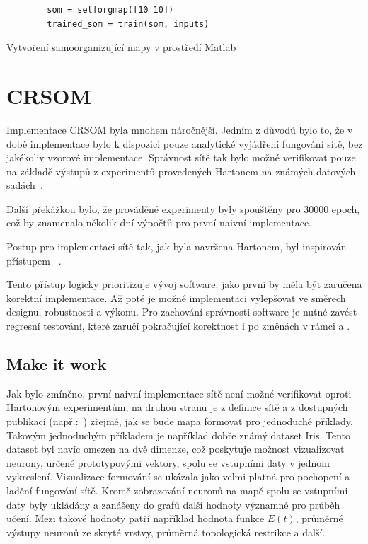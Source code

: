 \documentclass[thesis=M,czech]{FITthesis}[2012/06/26]
\begin{document}
\begin{listing}
    \begin{verbatim}
        som = selforgmap([10 10])
        trained_som = train(som, inputs)
    \end{verbatim} 
    \caption{Vytvoření samoorganizující mapy v prostředí Matlab} 
    \label{somcode}
\end{listing}

\section{CRSOM}\label{sec:crsom_impl}


Implementace CRSOM byla mnohem náročnější. Jedním z důvodů bylo to, že v době implementace bylo k dispozici pouze analytické vyjádření fungování sítě, bez jakékoliv vzorové implementace.
Správnost sítě tak bylo možné verifikovat pouze na základě výstupů z experimentů provedených Hartonem na známých datových sadách~\cite{hartonomain}.

Další překážkou bylo, že prováděné experimenty byly spouštěny pro $30 000$ epoch, což by znamenalo několik dní výpočtů pro první naivní implementace.
	
Postup pro implementaci sítě tak, jak byla navržena Hartonem, byl inspirován přístupem \textit{}~\cite{makeit}. 

Tento přístup logicky prioritizuje vývoj software: jako první by měla být zaručena korektní implementace. Až poté je možné implementaci vylepšovat ve směrech designu, robustnosti a výkonu. Pro zachování správnosti software je nutné zavést regresní testování, které zaručí pokračující korektnost i po změnách v rámci  a .

\subsection{Make it work}
 Jak bylo zmíněno, první naivní implementace sítě není možné verifikovat oproti Hartonovým experimentům, na druhou stranu je z definice sítě a z dostupných publikací (např.:~\cite{hartonomain}) zřejmé, jak se bude mapa formovat pro jednoduché příklady. Takovým jednoduchým příkladem je například dobře známý dataset Iris. Tento dataset byl navíc omezen na dvě dimenze, což poskytuje možnost vizualizovat neurony, určené prototypovými vektory, spolu se vstupními daty v jednom vykreslení. Vizualizace formování se ukázala jako velmi platná pro pochopení a ladění fungování sítě. Kromě zobrazování neuronů na mapě spolu se vstupními daty byly ukládány a zanášeny do grafů další hodnoty významné pro průběh učení. Mezi takové hodnoty patří například hodnota funkce $E(t)$, průměrné výstupy neuronů ze skryté vrstvy, průměrná topologická restrikce a další.
 
\end{document}
